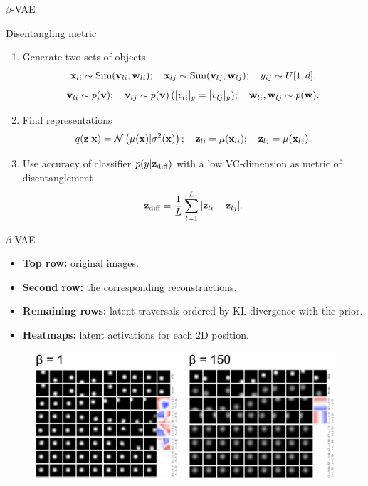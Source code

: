 \documentclass{beamer}
\begin{document}
\begin{frame}{$\beta$-VAE}
	\begin{block}{Disentangling metric}
		\begin{enumerate}
			\item Generate two sets of objects
			\[
			\mathbf{x}_{li} \sim \text{Sim}(\mathbf{v}_{li}, \mathbf{w}_{li}); \quad \mathbf{x}_{lj} \sim \text{Sim}(\mathbf{v}_{lj}, \mathbf{w}_{lj}); \quad y_{ij} \sim U[1, d].
			\]
			\[
			\mathbf{v}_{li} \sim p(\mathbf{v}); \quad \mathbf{v}_{lj} \sim p(\mathbf{v}) \, ([v_{li}]_y = [v_{lj}]_y); \quad \mathbf{w}_{li}, \mathbf{w}_{lj} \sim p(\mathbf{w}).
			\]
			\item Find representations
			\[
			q(\mathbf{z} | \mathbf{x}) = \mathcal{N}\left(\mu(\mathbf{x}) | \sigma^2(\mathbf{x})\right); \quad \mathbf{z}_{li} = \mu(\mathbf{x}_{li}); \quad \mathbf{z}_{lj} = \mu(\mathbf{x}_{lj}).
			\]
			\item Use accuracy of classifier $p(y | \mathbf{z}_{\text{diff}})$ with a low VC-dimension as metric of disentanglement
			\[
			\mathbf{z}_{\text{diff}} = \frac{1}{L} \sum_{l=1}^L | \mathbf{z}_{li} - \mathbf{z}_{lj} |.
			\]
		\end{enumerate}
	\end{block}
	
\end{frame}
\begin{frame}{$\beta$-VAE}
	\begin{itemize}
		\item \textbf{Top row:} original images.
		\item \textbf{Second row:} the corresponding reconstructions. 
		\item \textbf{Remaining rows:} latent traversals ordered by KL divergence with the prior. 
		\item \textbf{Heatmaps:} latent activations for each 2D position.
	\end{itemize}
	\begin{figure}
		\centering
		\includegraphics[width=\linewidth]{figs/betaVAE_6.png}
	\end{figure}
	
\end{frame}
\end{document}

